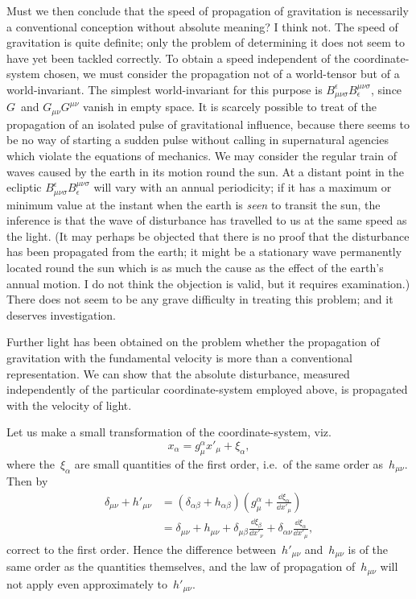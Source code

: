\documentclass[12pt]{book}
\begin{document}
Must we then conclude that the speed of propagation of gravitation is
necessarily a conventional conception without absolute meaning? I think not.
The speed of gravitation is quite definite; only the problem of determining
it does not seem to have yet been tackled correctly. To obtain a speed independent
of the coordinate\hyp{}system chosen, we must consider the propagation
not of a world\hyp{}tensor but of a world\hyp{}invariant. The simplest world\hyp{}invariant
for this purpose is $B_{\mu\nu\sigma}^{\epsilon} B_{\epsilon}^{\mu\nu\sigma}$, since $G$~and $G_{\mu\nu}G^{\mu\nu}$ vanish in empty space. It is
scarcely possible to treat of the propagation of an isolated pulse of gravitational
influence, because there seems to be no way of starting a sudden pulse
without calling in supernatural agencies which violate the equations of
mechanics. We may consider the regular train of waves caused by the earth
in its motion round the sun. At a distant point in the ecliptic $B_{\mu\nu\sigma}^{\epsilon} B_{\epsilon}^{\mu\nu\sigma}$ will
vary with an annual periodicity; if it has a maximum or minimum value at
the instant when the earth is \emph{seen} to transit the sun, the inference is that the
wave of disturbance has travelled to us at the same speed as the light. (It
may perhaps be objected that there is no proof that the disturbance has been
propagated from the earth; it might be a stationary wave permanently
located round the sun which is as much the cause as the effect of the earth's
annual motion. I do not think the objection is valid, but it requires examination.)
There does not seem to be any grave difficulty in treating this problem;
and it deserves investigation.

Further light has been obtained on the problem whether the propagation of gravitation with the fundamental velocity
is more than a conventional representation.
We can show that the absolute disturbance, measured independently of the particular coordinate\hyp{}system employed above,
is propagated with the velocity of light.

Let us make a small transformation of the coordinate\hyp{}system, viz.
\[
x_\alpha = g^\alpha_\mu x'_\mu + \xi_\alpha,
\]
where the~$\xi_\alpha$ are small quantities of the first order, i.e.\ of the same order as~$h_{\mu\nu}$.
Then by~
\begin{align*}
\delta_{\mu\nu} + h'_{\mu\nu} & = (\delta_{\alpha\beta} + h_{\alpha\beta})
                                  \left(g^\alpha_\mu + \frac{\dd\xi_\alpha}{\dd x'_\mu}\right)\\
                              & = \delta_{\mu\nu} + h_{\mu\nu} + \delta_{\mu\beta}\frac{\dd\xi_\beta}{\dd x'_\nu} +
                                  \delta_{\alpha\nu}\frac{\dd\xi_\alpha}{\dd x'_\mu},
\end{align*}
correct to the first order.
Hence the difference between~$h'_{\mu\nu}$ and~$h_{\mu\nu}$ is of the same order as the quantities themselves,
and the law of propagation of~$h_{\mu\nu}$ will not apply even approximately to~$h'_{\mu\nu}$.
\end{document}
